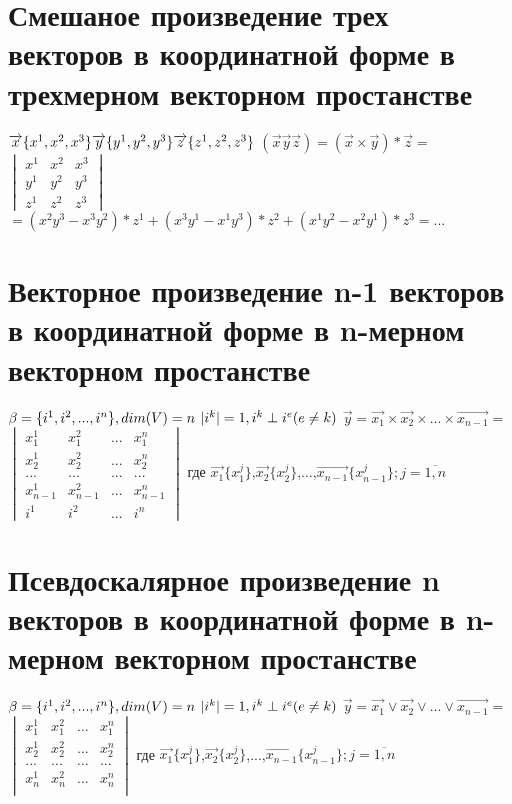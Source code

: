 \documentclass{book}
\begin{document}
\section{Смешаное произведение трех векторов в координатной форме в трехмерном векторном простанстве}
$\overrightarrow{x}\{x^1,x^2,x^3\}  \overrightarrow{y}\{y^1,y^2,y^3\}  \overrightarrow{z}\{z^1,z^2,z^3\}\\$
$(\overrightarrow{x}\overrightarrow{y}\overrightarrow{z})=(\overrightarrow{x}\times\overrightarrow{y})*\overrightarrow{z}=$
$\begin{vmatrix}
    x^1 & x^2 & x^3\\
    y^1 & y^2 & y^3\\
    z^1 & z^2 & z^3
\end{vmatrix}$
$=(x^2y^3-x^3y^2)*z^1+(x^3y^1-x^1y^3)*z^2+(x^1y^2-x^2y^1)*z^3=...$
\section{Векторное произведение n-1 векторов в координатной форме в n-мерном векторном простанстве}
$\beta=\{i^1,i^2,...,i^n\}, dim(V)=n\\$
$|i^k|=1, i^k \perp i^e (e \neq k)\\$
$\overrightarrow{y}=\overrightarrow{x_1}\times\overrightarrow{x_2}\times...\times\overrightarrow{x_{n-1}}=$
$\begin{vmatrix}
    x_1^1 & x_1^2 & ... & x_1^n\\
    x_2^1 & x_2^2 & ... & x_2^n\\
    ... & ... & ... & ...\\
    x_{n-1}^1 & x_{n-1}^2 & ... & x_{n-1}^n\\
    i^1 & i^2 & ... & i^n
\end{vmatrix}$ где $\overrightarrow{x_1}\{x^j_1\}$,$\overrightarrow{x_2}\{x^j_2\}$,...,$\overrightarrow{x_{n-1}}\{x^j_{n-1}\}; j=\overline{1,n}$

\section{Псевдоскалярное произведение n векторов в координатной форме в n-мерном векторном простанстве}
$\beta=\{i^1,i^2,...,i^n\}, dim(V)=n\\$
$|i^k|=1, i^k \perp i^e (e \neq k)\\$
$\overrightarrow{y}=\overrightarrow{x_1}\vee\overrightarrow{x_2}\vee...\vee\overrightarrow{x_{n-1}}=$
$\begin{vmatrix}
    x_1^1 & x_1^2 & ... & x_1^n\\
    x_2^1 & x_2^2 & ... & x_2^n\\
    ... & ... & ... & ...\\
    x_{n}^1 & x_{n}^2 & ... & x_{n}^n\\
\end{vmatrix}$ где $\overrightarrow{x_1}\{x^j_1\}$,$\overrightarrow{x_2}\{x^j_2\}$,...,$\overrightarrow{x_{n-1}}\{x^j_{n-1}\}; j=\overline{1,n}$
\newpage
\end{document}
